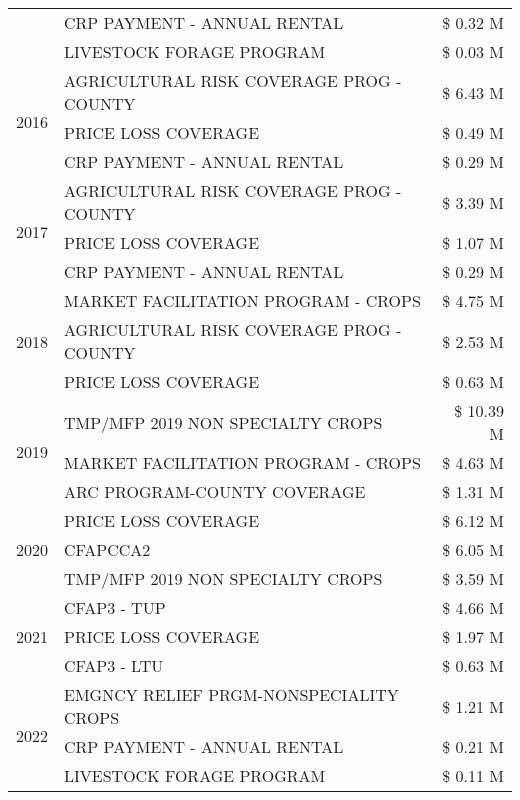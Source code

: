 \begin{tabular}{llr}
 & CRP PAYMENT - ANNUAL RENTAL & \$ 0.32 M \\
 & LIVESTOCK FORAGE PROGRAM & \$ 0.03 M \\
\cline{1-3}
\multirow[t]{3}{*}{2016} & AGRICULTURAL RISK COVERAGE PROG - COUNTY & \$ 6.43 M \\
 & PRICE LOSS COVERAGE & \$ 0.49 M \\
 & CRP PAYMENT - ANNUAL RENTAL & \$ 0.29 M \\
\cline{1-3}
\multirow[t]{3}{*}{2017} & AGRICULTURAL RISK COVERAGE PROG - COUNTY & \$ 3.39 M \\
 & PRICE LOSS COVERAGE & \$ 1.07 M \\
 & CRP PAYMENT - ANNUAL RENTAL & \$ 0.29 M \\
\cline{1-3}
\multirow[t]{3}{*}{2018} & MARKET FACILITATION PROGRAM - CROPS & \$ 4.75 M \\
 & AGRICULTURAL RISK COVERAGE PROG - COUNTY & \$ 2.53 M \\
 & PRICE LOSS COVERAGE & \$ 0.63 M \\
\cline{1-3}
\multirow[t]{3}{*}{2019} & TMP/MFP 2019 NON SPECIALTY CROPS & \$ 10.39 M \\
 & MARKET FACILITATION PROGRAM - CROPS & \$ 4.63 M \\
 & ARC PROGRAM-COUNTY COVERAGE & \$ 1.31 M \\
\cline{1-3}
\multirow[t]{3}{*}{2020} & PRICE LOSS COVERAGE & \$ 6.12 M \\
 & CFAPCCA2 & \$ 6.05 M \\
 & TMP/MFP 2019 NON SPECIALTY CROPS & \$ 3.59 M \\
\cline{1-3}
\multirow[t]{3}{*}{2021} & CFAP3 - TUP & \$ 4.66 M \\
 & PRICE LOSS COVERAGE & \$ 1.97 M \\
 & CFAP3 - LTU & \$ 0.63 M \\
\cline{1-3}
\multirow[t]{3}{*}{2022} & EMGNCY RELIEF PRGM-NONSPECIALITY CROPS & \$ 1.21 M \\
 & CRP PAYMENT - ANNUAL RENTAL & \$ 0.21 M \\
 & LIVESTOCK FORAGE PROGRAM & \$ 0.11 M \\
\cline{1-3}
\bottomrule
\end{tabular}
